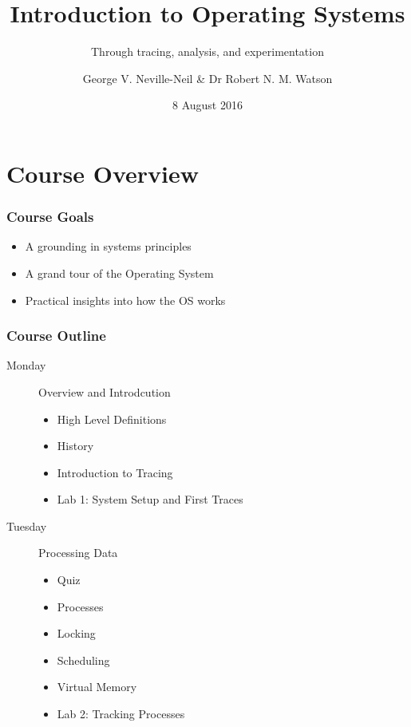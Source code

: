\documentclass[pdftex]{beamer} %
\begin{document}

\title{Introduction to Operating Systems}
\subtitle{Through tracing, analysis, and experimentation}
\author{George V. Neville-Neil \& Dr Robert N. M. Watson}
\date{8 August 2016}

\begin{frame}
  \titlepage
\end{frame}

\section{Course Overview}

\begin{frame}
  \frametitle{Course Goals}
  \begin{itemize}
  \item A grounding in systems principles
  \item A grand tour of the Operating System
  \item Practical insights into how the OS works
  \end{itemize}
\end{frame}

\begin{frame}
  \frametitle{Course Outline}
  \begin{description}
  \item[Monday] Overview and Introdcution
    \begin{itemize}
    \item High Level Definitions
    \item History
    \item Introduction to Tracing
    \item Lab 1: System Setup and First Traces
    \end{itemize}
  \item[Tuesday] Processing Data
    \begin{itemize}
    \item Quiz
    \item Processes 
    \item Locking
    \item Scheduling
    \item Virtual Memory
    \item Lab 2: Tracking Processes
    \end{itemize}
  \end{description}
\end{frame}
\end{document}
